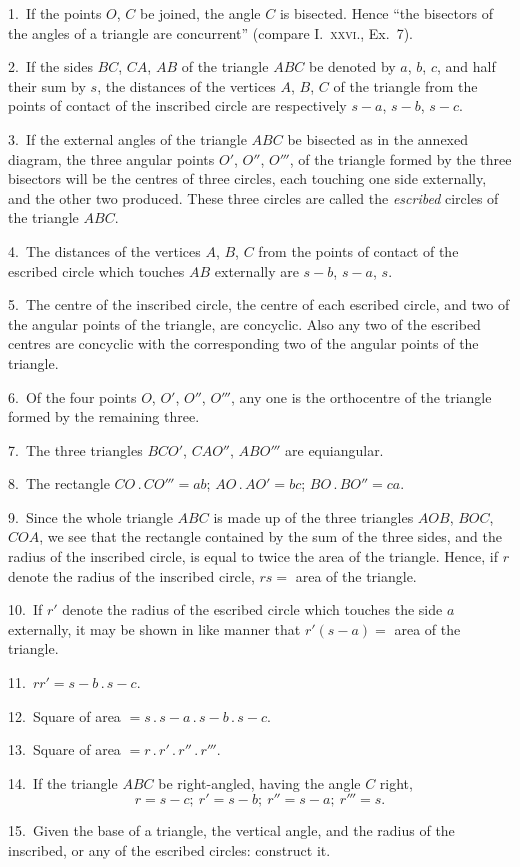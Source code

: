 \documentclass[oneside]{book}
\begin{document}
\begin{footnotesize}
1.~If the points $O$, $C$ be joined, the angle $C$ is bisected.
Hence ``the bisectors of the angles of a triangle are concurrent''
(compare I.~\textsc{xxvi.}, Ex.~7).

2.~If the sides $BC$, $CA$, $AB$ of the triangle $ABC$ be denoted by
$a$, $b$, $c$, and half their sum by $s$, the distances of the vertices
$A$, $B$, $C$ of the triangle from the points of contact of the inscribed
circle are respectively $s-a$, $s-b$, $s-c$.


3.~If the external angles of the triangle $ABC$ be bisected as in
the annexed diagram, the three
angular points $O'$, $O''$, $O'''$, of
the triangle formed by the three
bisectors will be the centres of
three circles, each touching one
side externally, and the other
two produced. These three
circles are called the \emph{escribed}
circles of the triangle $ABC$.

4.~The distances of the vertices
$A$, $B$, $C$ from the points
of contact of the escribed circle
which touches $AB$ externally
are $s-b$, $s-a$, $s$.

5.~The centre of the inscribed
circle, the centre of each
escribed circle, and two of the
angular points of the triangle,
are concyclic. Also any two of the escribed centres are concyclic
with the corresponding two of the angular points of the triangle.

6.~Of the four points $O$, $O'$, $O''$, $O'''$, any one is the orthocentre
of the triangle formed by the remaining three.

7.~The three triangles $BCO'$, $CAO''$, $ABO'''$ are equiangular.

8.~The rectangle $CO\,.\,CO''' = ab$; $AO\,.\,AO' = bc$; $BO\,.\,BO''
= ca$.

9.~Since the whole triangle $ABC$ is made up of the three triangles
$AOB$, $BOC$, $COA$, we see that the rectangle contained by
the sum of the three sides, and the radius of the inscribed circle,
is equal to twice the area of the triangle. Hence, if $r$ denote the
radius of the inscribed circle, $rs =$ area of the triangle.

10.~If $r'$ denote the radius of the escribed circle which touches
the side $a$ externally, it may be shown in like manner that
$r'(s-a) =$ area of the triangle.

11.~$rr' = s-b\,.\,s-c$.

12.~Square of area $= s\,.\,s-a\,.\,s-b\,.\,s-c$.

13.~Square of area $= r\,.\,r'\,.\,r''\,.\,r'''$.

14.~If the triangle $ABC$ be right-angled, having the angle $C$
right,
\[
r = s-c;\ r' = s-b;\ r'' = s-a;\ r''' = s.
\]

15.~Given the base of a triangle, the vertical angle, and the
radius of the inscribed, or any of the escribed circles: construct
it.
\par\end{footnotesize}
\end{document}

